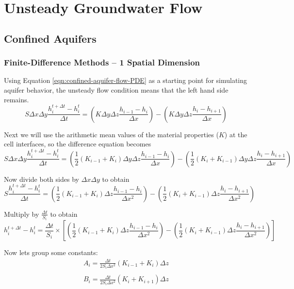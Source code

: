 \section{Unsteady Groundwater Flow}
\subsection{Confined Aquifers}
\subsubsection{Finite-Difference Methods -- 1 Spatial Dimension}
Using Equation \ref{eqn:confined-aquifer-flow-PDE} as a starting point for simulating aquifer behavior, the unsteady flow condition means that the left hand side remains.
 \begin{equation}
S \Delta x \Delta y  \frac{h_{i}^{t+\Delta t} - h_{i}^{t}}{\Delta t} = 
(K \Delta y \Delta z \frac{h_{i-1} - h_{i}}{\Delta x}) - 
(K \Delta y \Delta z \frac{h_{i} - h_{i+1}}{\Delta x})
\end{equation}

Next we will use the arithmetic mean values of the material properties ($K$) at the cell interfaces, so the difference equation becomes
 \begin{equation}
S \Delta x \Delta y  \frac{h_{i}^{t+\Delta t} - h_{i}^{t}}{\Delta t} = 
(\frac{1}{2}(K_{i-1}+K_{i}) \Delta y \Delta z \frac{h_{i-1} - h_{i}}{\Delta x}) - 
(\frac{1}{2}(K_{i}+K_{i-1}) \Delta y \Delta z \frac{h_{i} - h_{i+1}}{\Delta x})
\end{equation}

Now divide both sides by $\Delta x \Delta y$ to obtain
 \begin{equation}
S  \frac{h_{i}^{t+\Delta t} - h_{i}^{t}}{\Delta t} = 
(\frac{1}{2}(K_{i-1}+K_{i})  \Delta z \frac{h_{i-1} - h_{i}}{\Delta x^2}) - 
(\frac{1}{2}(K_{i}+K_{i-1})  \Delta z \frac{h_{i} - h_{i+1}}{\Delta x^2})
\end{equation}

Multiply by $\frac{\Delta t}{S_{i}}$ to obtain
 \begin{equation}
  h_{i}^{t+\Delta t} - h_{i}^{t} = 
\frac{\Delta t}{S_{i}} \times [ (\frac{1}{2}(K_{i-1}+K_{i})  \Delta z \frac{h_{i-1} - h_{i}}{\Delta x^2}) - 
(\frac{1}{2}(K_{i}+K_{i-1})  \Delta z \frac{h_{i} - h_{i+1}}{\Delta x^2}) ]
\end{equation}

Now lets group some constants:
\begin{equation}
\begin{matrix}
A_{i} = \frac{\Delta t}{2 S_i \Delta x^2}(K_{i-1}+K_{i}) \Delta z \\
~ \\
B_{i} = \frac{\Delta t}{2 S_i \Delta x^2}(K_{i}+K_{i+1}) \Delta z
\end{matrix}
\end{equation}

